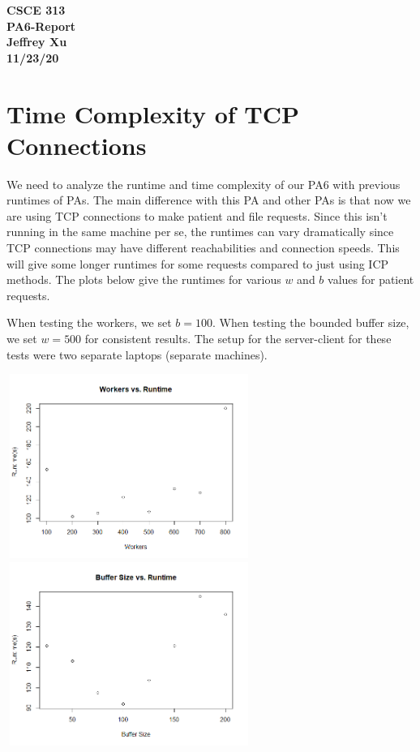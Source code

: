 \documentclass[12pt]{article}
\begin{document}
\begin{center}

{\bf
CSCE 313\\
PA6-Report\\
Jeffrey Xu\\
11/23/20\\
}

\end{center}

\section{Time Complexity of TCP Connections}

We need to analyze the runtime and time complexity of our PA6 with previous runtimes of PAs. The main difference with this PA and other PAs is that now we are using TCP connections to make patient and file requests. Since this isn't running in the same machine per se, the runtimes can vary dramatically since TCP connections may have different reachabilities and connection speeds. This will give some longer runtimes for some requests compared to just using ICP methods. The plots below give the runtimes for various $w$ and $b$ values for patient requests. 

When testing the workers, we set $b=100$. When testing the bounded buffer size, we set $w=500$ for consistent results. The setup for the server-client for these tests were two separate laptops (separate machines). 

\begin{center}
\includegraphics[width=8cm, height=6cm]{PA6_WT}
\includegraphics[width=8cm, height=6cm]{PA6BT}
\end{center}
\end{document}
